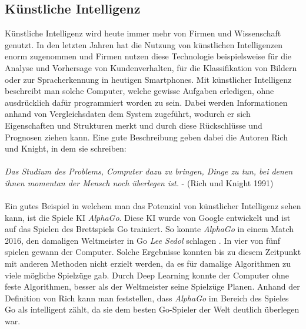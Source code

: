 \documentclass[a4paper,12pt,oneside]{article}
\begin{document}
\subsection{Künstliche Intelligenz}\label{s.ki}
Künstliche Intelligenz wird heute immer mehr von Firmen und Wissenschaft genutzt. In den letzten Jahren hat die Nutzung von künstlichen Intelligenzen enorm zugenommen und Firmen nutzen diese Technologie beispielsweise für die Analyse und Vorhersage von Kundenverhalten, für die Klassifikation von Bildern oder zur Spracherkennung in heutigen Smartphones. Mit künstlicher Intelligenz beschreibt man solche Computer, welche gewisse Aufgaben erledigen, ohne ausdrücklich dafür programmiert worden zu sein. Dabei werden Informationen anhand von Vergleichsdaten dem System zugeführt, wodurch er sich Eigenschaften und Strukturen merkt und durch diese Rückschlüsse und Prognosen ziehen kann. Eine gute Beschreibung geben dabei die Autoren Rich und Knight, in dem sie schreiben:\\\\
 \textit{Das Studium des Problems, Computer dazu zu bringen, Dinge zu tun, bei denen ihnen momentan der Mensch noch überlegen ist.} - (Rich und Knight 1991)\\\\
Ein gutes Beispiel in welchem man das Potenzial von künstlicher Intelligenz sehen kann, ist die Spiele KI  \textit{AlphaGo}. Diese KI wurde von Google entwickelt und ist auf das Spielen des Brettspiels Go trainiert. So konnte \textit{AlphaGo} in einem Match 2016, den damaligen Weltmeister in Go \textit{Lee Sedol} schlagen \cite{Alpha2016GO}. In vier von fünf spielen gewann der Computer. Solche Ergebnisse konnten bis zu diesem Zeitpunkt mit anderen Methoden nicht erzielt werden, da es für damalige Algorithmen zu viele mögliche Spielzüge gab. Durch Deep Learning konnte der Computer ohne feste Algorithmen, besser als der Weltmeister seine Spielzüge Planen. Anhand der Definition von Rich kann man feststellen, dass  \textit{AlphaGo}  im Bereich des Spieles Go als intelligent zählt, da sie dem besten Go-Spieler der Welt deutlich überlegen war.
\end{document}

